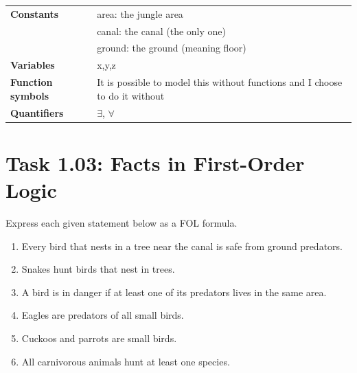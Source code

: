 \documentclass[11pt,a4paper]{article}
\newenvironment{solution}{%
    \begin{tcolorbox}[
        breakable,
        colback=green!4,
        colframe=green!50!black,
        fonttitle=\bfseries,
        title={ Solution},
        left=6pt, right=6pt, top=4pt, bottom=4pt
    ]%
    }{%
    \end{tcolorbox}%
}
\begin{document}
\begin{solution}
\begin{center}
\begin{tabular}{>{\bfseries}p{3.5cm} p{9cm}}
                Constants & area: the jungle area \\
                & canal: the canal (the only one)\\
                & ground: the ground (meaning floor) \\
                Variables & x,y,z  \\
                Function symbols
                & It is possible to model this without functions and I choose to do it without \\
                Quantifiers & $\exists$, $\forall$ \\
                \bottomrule
            \end{tabular}
        \end{center}
    \end{solution}
    \section*{Task 1.03: Facts in First-Order Logic}

    Express each given statement below as a FOL formula.

    \begin{enumerate}
        \item Every bird that nests in a tree near the canal is safe from ground predators.
        \item Snakes hunt birds that nest in trees.
        \item A bird is in danger if at least one of its predators lives in the same area.
        \item Eagles are predators of all small birds.
        \item Cuckoos and parrots are small birds.
        \item All carnivorous animals hunt at least one species.
    \end{enumerate}
\end{document}
